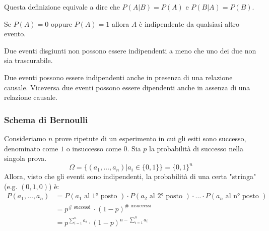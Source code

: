 \begin{observation}
	Questa definizione equivale a dire che $P(A\vert B) = P(A)$ e $P(B \vert A) = P(B)$.
\end{observation}

\begin{observation}
	Se $P(A)=0$  oppure $P(A)=1$ allora $A$ è indipendente da qualsiasi altro evento.
\end{observation}

\begin{observation}
	Due eventi disgiunti non possono essere indipendenti a meno che uno dei due non sia trascurabile.
\end{observation}

\begin{observation}
	Due eventi possono essere indipendenti anche in presenza di una relazione causale. Viceversa due eventi possono essere dipendenti anche in assenza di una relazione causale.
\end{observation}

\subsubsection{Schema di Bernoulli}
Consideriamo $n$ prove ripetute di un esperimento in cui gli esiti sono successo, denominato come $1$ o insuccesso come $0$. Sia $p$ la probabilità di successo nella singola prova.
\begin{equation*}
	\Omega = \{(a_1, \ldots, a_n) \vert a_i \in \{0,1\}\} = \{0,1\}^n
\end{equation*}
Allora, visto che gli eventi sono indipendenti, la probabilità di una certa "stringa" (e.g. $(0,1,0)$) è:
\begin{align*}
	P(a_1, \ldots, a_n) & = P(a_1\text{ al 1° posto }) \cdot P(a_2\text{ al 2° posto }) \cdot \ldots \cdot P(a_n\text{ al n° posto }) \\
	& = p^{\#\text{ successi }} \cdot (1-p) ^ {\#\text{ insuccessi }} \\
	& = p^{\sum_{i=1}^{n}a_i} \cdot (1-p)^{n - \sum_{i=1}^{n}a_i} 
\end{align*}